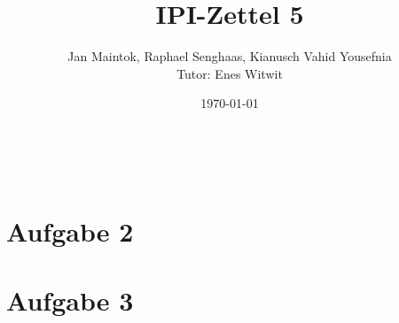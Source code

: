 \documentclass[11pt,a4paper,captions=tableheading]{scrartcl}
\title{IPI-Zettel 5}
\subtitle{Jan Maintok, Raphael Senghaas, Kianusch Vahid Yousefnia\\ Tutor: Enes Witwit}
\date{\today}
\makeatletter
\let\inserttitle\@title
\let\insertsubtitle\@subtitle
\makeatother
\begin{document}
\setcounter{page}{1}
\begin{center}
\vspace*{0pt}
{\huge \normalfont\sffamily \noindent\textbf{\inserttitle}}\\[0.6\baselineskip]
{\Large \normalfont\sffamily \noindent\textbf{\insertsubtitle}}
\end{center}
\vspace*{10pt}
\noindent

\section*{Aufgabe 2}

\section*{Aufgabe 3}

\end{document}
